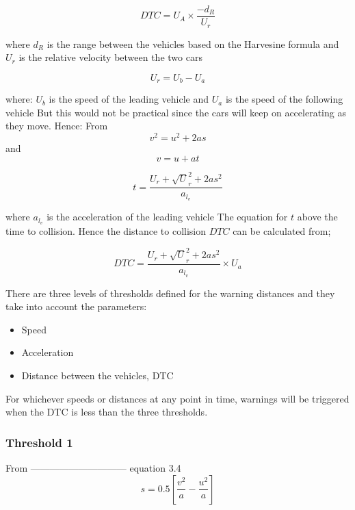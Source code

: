 \documentclass[12pt]{report}
\begin{document}
\begin{equation}
	DTC  = U_A \times \frac{-d_R}{U_r}
\end{equation} 

where $d_R$ is the range between the vehicles based on the Harvesine formula and $U_r$ is the relative velocity between the two cars

\begin{equation}
	U_r = U_b - U_a
\end{equation}

where: $U_b$ is the speed of the leading vehicle and $U_a$ is the speed of the following vehicle
But this would not be practical since the cars will keep on accelerating as they move. Hence: 
From 
\begin{equation}
	v^2 = u^2 + 2as 
\end{equation}
and
\begin{equation}
	v= u + at
\end{equation}

\begin{equation}
	t = \frac{U_r + \surd U_r^2 + 2as^2}{a_{l_v}}
\end{equation}

where ${a_{l_v}}$ is the acceleration of the leading vehicle
The equation for $t$ above the time to collision. Hence the distance to collision $DTC$ can be calculated from;

\begin{equation}
	DTC = \frac{U_r + \surd U_r^2 + 2as^2}{a_{l_v}} \times U_a
\end{equation}

There are three levels of thresholds defined for the warning distances and they take into account the parameters:
\begin{itemize}
	\item Speed
	\item Acceleration
	\item Distance between the vehicles, DTC
\end{itemize}

For whichever speeds or distances at any point in time, warnings will be triggered when the DTC is less than the three thresholds.

\subsubsection{Threshold 1}
From ------------------------------ equation 3.4 
\begin{equation}
	s = 0.5 \left[ \frac{v^2}{a} - \frac{u^2}{a}\right]
\end{equation}
\end{document}
